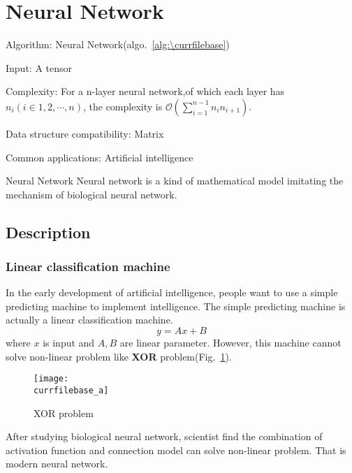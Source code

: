 \documentclass[catalog.tex]{subfiles}
\begin{document}
\def\pbname{Neural Network} %

\section{\pbname} 

\begin{overview}
\item [Algorithm:] Neural Network(algo.~\ref{alg:\currfilebase}) 
\item [Input:] A tensor
\item [Complexity:] For a n-layer neural network,of which each layer has $n_i(i\in{1,2,\cdots,n})$, the complexity is $\mathcal{O}(\sum_{i=1}^{n-1}n_in_{i+1})$.
\item [Data structure compatibility:] Matrix
\item [Common applications:] Artificial intelligence
\end{overview}


\begin{problem}{\pbname}
	Neural network is a kind of mathematical model imitating the mechanism of biological neural network.
\end{problem}


\subsection*{Description}
\subsubsection{Linear classification machine}
In the early development of artificial intelligence, people want to use a simple predicting machine to implement intelligence. The simple predicting machine is actually a linear classification machine.
\begin{equation}
y=Ax+B
\end{equation}
where $x$ is input and $A, B$ are linear parameter. However, this machine cannot solve non-linear problem like \textbf{XOR}\cite{minsky69perceptrons} problem(Fig.~\ref{fig:\currfilebase_a}).
\begin{figure}[!htb]
\centering
\texttt{[image: \\currfilebase\_a]}
	\caption{XOR problem}
	\label{fig:\currfilebase_a}
\end{figure}
After studying biological neural network, scientist find the combination of activation function and connection model can solve non-linear problem. That is modern neural network.
\end{document}
